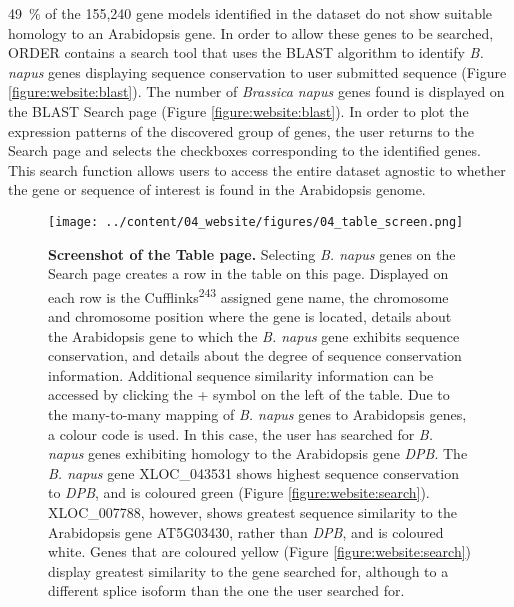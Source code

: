 \documentclass[12pt,]{book}
\begin{document}
49~\% of the 155,240 gene models identified in the dataset do not show
suitable homology to an Arabidopsis gene. In order to allow these genes
to be searched, ORDER contains a search tool that uses the BLAST
algorithm to identify \emph{B. napus} genes displaying sequence
conservation to user submitted sequence (Figure
\ref{figure:website:blast}). The number of \emph{Brassica napus} genes
found is displayed on the BLAST Search page (Figure
\ref{figure:website:blast}). In order to plot the expression patterns of
the discovered group of genes, the user returns to the Search page and
selects the checkboxes corresponding to the identified genes. This
search function allows users to access the entire dataset agnostic to
whether the gene or sequence of interest is found in the Arabidopsis
genome.

\begin{figure}[htbp]
\centering
\texttt{[image: ../content/04\_website/figures/04\_table\_screen.png]}
\caption{\textbf{Screenshot of the Table page.} Selecting \emph{B.
napus} genes on the Search page creates a row in the table on this page.
Displayed on each row is the Cufflinks\textsuperscript{243} assigned
gene name, the chromosome and chromosome position where the gene is
located, details about the Arabidopsis gene to which the \emph{B. napus}
gene exhibits sequence conservation, and details about the degree of
sequence conservation information. Additional sequence similarity
information can be accessed by clicking the + symbol on the left of the
table. Due to the many-to-many mapping of \emph{B. napus} genes to
Arabidopsis genes, a colour code is used. In this case, the user has
searched for \emph{B. napus} genes exhibiting homology to the
Arabidopsis gene \emph{DPB}. The \emph{B. napus} gene XLOC\_043531 shows
highest sequence conservation to \emph{DPB}, and is coloured green
(Figure \ref{figure:website:search}). XLOC\_007788, however, shows
greatest sequence similarity to the Arabidopsis gene AT5G03430, rather
than \emph{DPB}, and is coloured white. Genes that are coloured yellow
(Figure \ref{figure:website:search}) display greatest similarity to the
gene searched for, although to a different splice isoform than the one
the user searched for.}\label{figure:website:table}
\end{figure}
\end{document}

